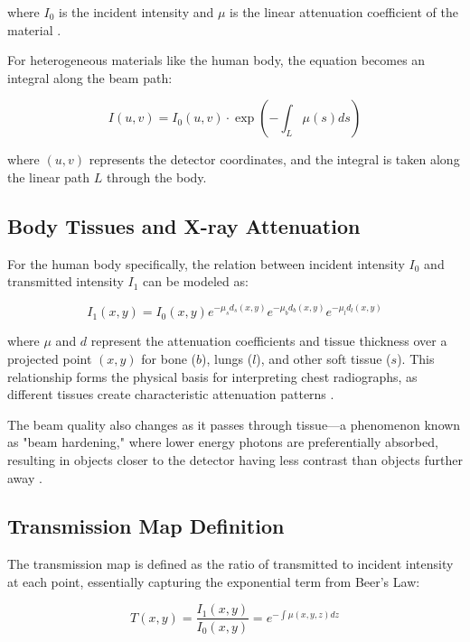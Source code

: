\documentclass[nomenclature, english, bibtex]{kththesis}
\numberwithin{listing}{chapter}
\begin{document}
where $I_0$ is the incident intensity and $\mu$ is the linear attenuation coefficient of the material \cite{cullity2014elements}. 

For heterogeneous materials like the human body, the equation becomes an integral along the beam path:

\begin{equation}
I(u,v) = I_0(u,v) \cdot \exp\left(-\int_L \mu(s)ds\right)
\end{equation}

where $(u,v)$ represents the detector coordinates, and the integral is taken along the linear path $L$ through the body.

\subsection{Body Tissues and X-ray Attenuation}
For the human body specifically, the relation between incident intensity $I_0$ and transmitted intensity $I_1$ can be modeled as:

\begin{equation}
I_1(x, y) = I_0(x, y) e^{-\mu_s d_s(x,y)} e^{-\mu_b d_b(x,y)} e^{-\mu_l d_l(x, y)}
\end{equation}

where $\mu$ and $d$ represent the attenuation coefficients and tissue thickness over a projected point $(x,y)$ for bone ($b$), lungs ($l$), and other soft tissue ($s$). This relationship forms the physical basis for interpreting chest radiographs, as different tissues create characteristic attenuation patterns \cite{prokop2003principles}.

The beam quality also changes as it passes through tissue—a phenomenon known as "beam hardening," where lower energy photons are preferentially absorbed, resulting in objects closer to the detector having less contrast than objects further away \cite{bushberg2011essential}.

\subsection{Transmission Map Definition}
The transmission map is defined as the ratio of transmitted to incident intensity at each point, essentially capturing the exponential term from Beer's Law:

\begin{equation}
T(x,y) = \frac{I_1(x,y)}{I_0(x,y)} = e^{-\int \mu(x,y,z) dz}
\end{equation}
\end{document}
